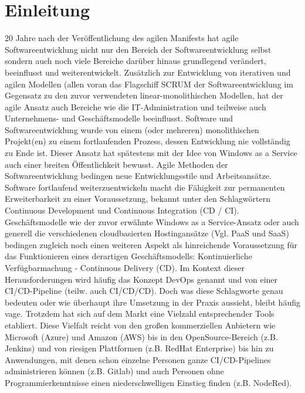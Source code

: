 \section{Einleitung}
\label{Einleitung}
20 Jahre nach der Veröffentlichung des agilen Manifests \cite{eckstein_20_2021} hat agile Softwareentwicklung nicht nur den Bereich der Softwareentwicklung selbst sondern auch noch viele Bereiche darüber hinaus grundlegend verändert, beeinflusst und weiterentwickelt. Zusätzlich zur Entwicklung von iterativen und agilen Modellen (allen voran das Flagschiff \gls{SCRUM} der Softwareentwicklung im Gegensatz zu den zuvor verwendeten linear-monolithischen Modellen, hat der agile Ansatz auch Bereiche wie die IT-Administration und teilweise auch Unternehmens- und Geschäftsmodelle beeinflusst.
Software und Softwareentwicklung wurde von einem (oder mehreren) monolithischen Projekt(en) zu einem fortlaufenden Prozess, dessen Entwicklung nie vollständig zu Ende ist. Dieser Ansatz hat spätestens mit der Idee von \grqq{}Windows as a Service\glqq{} \cite{jaimeo_kurzanleitung_2021} auch einer breiten Öffentlichkeit bewusst.\newline
Agile Methoden der Softwareentwicklung bedingen neue Entwicklungsstile und Arbeitsansätze. Software fortlaufend weiterzuentwickeln  macht die Fähigkeit zur permanenten Erweiterbarkeit zu einer Voraussetzung, bekannt unter den Schlagwörtern \glqq{} Continuous Development\grqq{} und \glqq{} Continuous Integration\grqq{}  (\acrshort{CD} / \acrshort{CI}). Geschäftsmodelle wie der zuvor erwähnte \glqq{}Windows as a Service\grqq{}-Ansatz oder auch generell die verschiedenen cloudbasierten Hostingansätze (Vgl. \acrshort{PaaS} und \acrshort{SaaS}) bedingen zugleich noch einen weiteren Aspekt als hinreichende Voraussetzung für das Funktionieren eines derartigen Geschäftsmodells: Kontinuierliche Verfügbarmachung - \glqq{}Continuous Delivery\grqq{} (\acrshort{CD}).\newline
Im Kontext dieser Herausforderungen wird häufig das Konzept \glqq{}\gls{DevOps}\grqq{} genannt und von einer \acrshort{CI}/\acrshort{CD}-Pipeline (teilw. auch \acrshort{CI}/\acrshort{CD}/\acrshort{CD}).
Doch was diese Schlagworte genau bedeuten oder wie überhaupt ihre Umsetzung in der Praxis aussieht, bleibt
häufig vage. Trotzdem hat sich auf dem Markt eine Vielzahl entsprechender Tools etabliert.
Diese Vielfalt reicht von den großen kommerziellen Anbietern wie Microsoft (Azure) und Amazon
(AWS) bis in den OpenSource-Bereich (z.B. Jenkins) und von riesigen Plattformen (z.B. RedHat Enterprise) bis hin zu Anwendungen, mit denen schon einzelne Personen ganze \acrshort{CI}/\acrshort{CD}-Pipelines administrieren können (z.B. Gitlab) und auch Personen ohne Programmierkenntnisse einen niederschwelligen Einstieg finden (z.B. NodeRed).